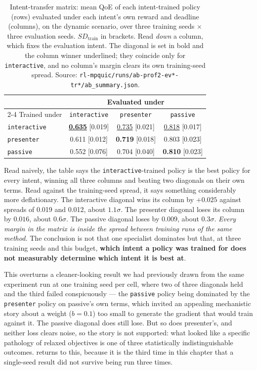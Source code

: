 \begin{table}[t]
  \centering
  \caption[Intent-transfer matrix]{Intent-transfer matrix: mean QoE of each intent-trained policy (rows) evaluated under each
  intent's own reward and deadline (columns), on the dynamic scenario, over three training seeds
  $\times$ three evaluation seeds. $\mathit{SD}_{\mathrm{train}}$ in brackets. Read \emph{down} a column,
  which fixes the evaluation intent. The diagonal is set in bold and the column winner underlined; they
  coincide only for \texttt{interactive}, and no column's margin clears its own training-seed spread.
  Source: \texttt{rl-mpquic/runs/ab-prof2-ev*-tr*/ab\_summary.json}.}
  \label{tab:p2transfer}
  \begin{tabular}{lccc}
    \toprule
    & \multicolumn{3}{c}{Evaluated under} \\
    \cmidrule(l){2-4}
    Trained under & \texttt{interactive} & \texttt{presenter} & \texttt{passive} \\
    \midrule
    \texttt{interactive} & \textbf{\underline{0.635}} [0.019] & \underline{0.735} [0.021] & \underline{0.818} [0.017] \\
    \texttt{presenter}   & 0.611 [0.012] & \textbf{0.719} [0.018] & 0.803 [0.023] \\
    \texttt{passive}     & 0.552 [0.076] & 0.704 [0.040] & \textbf{0.810} [0.023] \\
    \bottomrule
  \end{tabular}
\end{table}

Read naively, the table says the \texttt{interactive}-trained policy is the best policy for every
intent, winning all three columns and beating two diagonals on their own terms. Read against the
training-seed spread, it says something considerably more deflationary. The interactive diagonal wins
its column by $+0.025$ against spreads of 0.019 and 0.012, about $1.1\sigma$. The presenter diagonal
loses its column by $0.016$, about $0.6\sigma$. The passive diagonal loses by $0.009$, about
$0.3\sigma$. \emph{Every margin in the matrix is inside the spread between training runs of the same
method.} The conclusion is not that one specialist dominates but that, at three training seeds and this budget, \textbf{which intent a policy was trained for does not measurably determine which
intent it is best at}.

This overturns a cleaner-looking result we had previously drawn from the same experiment run at one
training seed per cell, where two of three diagonals held and the third failed conspicuously --- the
\texttt{passive} policy being dominated by the \texttt{presenter} policy on passive's own terms, which
invited an appealing mechanistic story about a weight ($b = 0.1$) too small to generate the gradient
that would train against it. The passive diagonal does still lose. But so does presenter's, and neither
loss clears noise, so the story is not supported: what looked like a specific pathology of relaxed
objectives is one of three statistically indistinguishable outcomes.  returns to
this, because it is the third time in this chapter that a single-seed result did not survive being run
three times.

